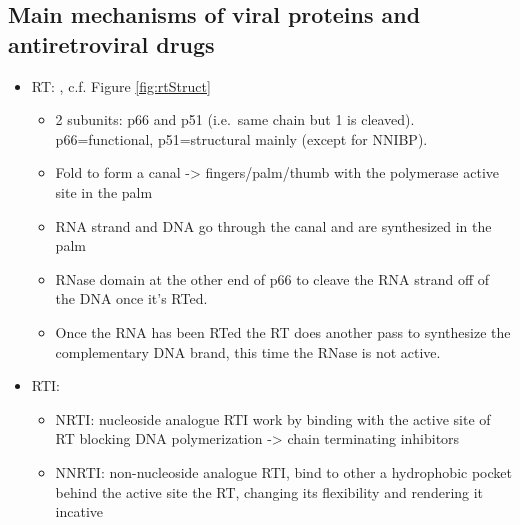 \documentclass[
  11pt,
  twoside]{scrbook}
\begin{document}
\hypertarget{main-mechanisms-of-viral-proteins-and-antiretroviral-drugs}{%
\subsection{Main mechanisms of viral proteins and antiretroviral drugs}\label{main-mechanisms-of-viral-proteins-and-antiretroviral-drugs}}

\begin{itemize}
\item
  RT: \autocite{sarafianosStructureFunctionHIV12009}, c.f. Figure \ref{fig:rtStruct}

  \begin{itemize}
  \item
    2 subunits: p66 and p51 (i.e.~same chain but 1 is cleaved). p66=functional, p51=structural mainly (except for NNIBP).
  \item
    Fold to form a canal -\textgreater{} fingers/palm/thumb with the polymerase active site in the palm
  \item
    RNA strand and DNA go through the canal and are synthesized in the palm
  \item
    RNase domain at the other end of p66 to cleave the RNA strand off of the DNA once it's RTed.
  \item
    Once the RNA has been RTed the RT does another pass to synthesize the complementary DNA brand, this time the RNase is not active.
  \end{itemize}
\item
  RTI:

  \begin{itemize}
  \item
    NRTI: nucleoside analogue RTI work by binding with the active site of RT blocking DNA polymerization -\textgreater{} chain terminating inhibitors
  \item
    NNRTI: non-nucleoside analogue RTI, bind to other a hydrophobic pocket behind the active site the RT, changing its flexibility and rendering it incative \autocite{esnoufUniqueFeaturesStructure1997}
  \end{itemize}
\end{itemize}
\end{document}
